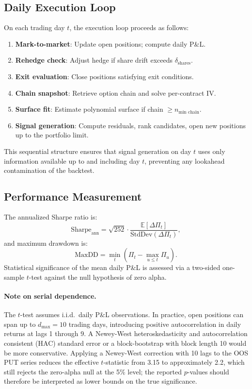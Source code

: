 \documentclass[10pt,twocolumn]{article}
\begin{document}
\subsection{Daily Execution Loop}

On each trading day $t$, the execution loop proceeds as follows:
\begin{enumerate}[noitemsep]
  \item \textbf{Mark-to-market}: Update open positions; compute daily P\&L.
  \item \textbf{Rehedge check}: Adjust hedge if share drift exceeds
        $\delta_{\text{shares}}$.
  \item \textbf{Exit evaluation}: Close positions satisfying exit conditions.
  \item \textbf{Chain snapshot}: Retrieve option chain and solve per-contract IV.
  \item \textbf{Surface fit}: Estimate polynomial surface if chain $\geq
        n_{\text{min chain}}$.
  \item \textbf{Signal generation}: Compute residuals, rank candidates, open
        new positions up to the portfolio limit.
\end{enumerate}
This sequential structure ensures that signal generation on day $t$ uses
only information available up to and including day $t$, preventing any
lookahead contamination of the backtest.

\subsection{Performance Measurement}

The annualized Sharpe ratio is:
%
\begin{equation}
\text{Sharpe}_{\text{ann}} = \sqrt{252}\cdot
\frac{\mathbb{E}[\Delta\Pi_t]}{\text{StdDev}(\Delta\Pi_t)},
\end{equation}
%
and maximum drawdown is:
%
\begin{equation}
\text{MaxDD} = \min_t\!\left(\Pi_t - \max_{u \leq t}\Pi_u\right).
\end{equation}
%
Statistical significance of the mean daily P\&L is assessed via a two-sided
one-sample $t$-test against the null hypothesis of zero alpha.

\paragraph{Note on serial dependence.}
The $t$-test assumes i.i.d.\ daily P\&L observations.  In practice,
open positions can span up to $d_{\text{max}} = 10$ trading days, introducing
positive autocorrelation in daily returns at lags 1 through 9.  A
Newey-West \cite{newey1987} heteroskedasticity and autocorrelation consistent
(HAC) standard error or a block-bootstrap with block length 10 would be more
conservative.  Applying a Newey-West correction with 10 lags to the OOS PUT series
reduces the effective $t$-statistic from 3.15 to approximately 2.2,
which still rejects the zero-alpha null at the 5\% level; the reported
$p$-values should therefore be interpreted as lower bounds on the true
significance.
\end{document}

